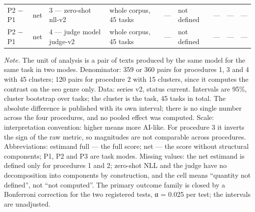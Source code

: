 \begin{table}
\begin{tabular}{lllllllll}
P2 − P1 & net & 3 — zero-shot nll-v2 & whole corpus, 45 tasks & — & not defined & — & — & — \\
P2 − P1 & net & 4 — judge model judge-v2 & whole corpus, 45 tasks & — & not defined & — & — & — \\
\bottomrule
\end{tabular}
\begin{minipage}{\linewidth}\footnotesize\vspace{2pt}
\textit{Note.} The unit of analysis is a pair of texts produced by the same model for the same task in two modes. Denominator: 359 or 360 pairs for procedures 1, 3 and 4 with 45 clusters; 120 pairs for procedure 2 with 15 clusters, since it computes the contrast on the seo genre only. Data: series v2, status current. Intervals are 95\%, cluster bootstrap over tasks; the cluster is the task, 45 tasks in total. The absolute difference is published with its own interval; there is no single number across the four procedures, and no pooled effect was computed. Scale: interpretation convention: higher means more AI-like. For procedure 3 it inverts the sign of the raw metric, so magnitudes are not comparable across procedures. Abbreviations: estimand full — the full score; net — the score without structural components; P1, P2 and P3 are task modes. Missing values: the net estimand is defined only for procedures 1 and 2; zero-shot NLL and the judge have no decomposition into components by construction, and the cell means ``quantity not defined'', not ``not computed''. The primary outcome family is closed by a Bonferroni correction for the two registered tests, α = 0.025 per test; the intervals are unadjusted.
\end{minipage}
\end{table}
